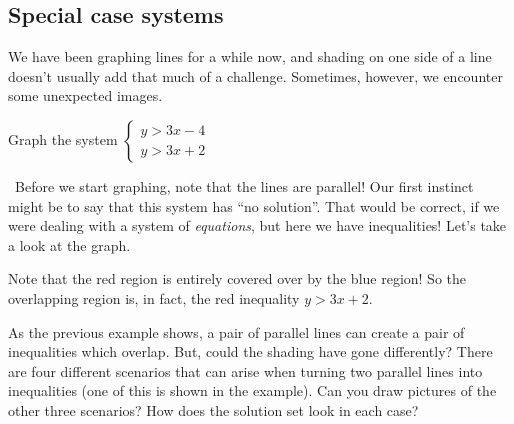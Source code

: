 \subsection{Special case systems}

We have been graphing lines for a while now, and shading on one side of a line doesn't usually add that much of a challenge. Sometimes, however, we encounter some unexpected images.

\begin{boxedex}

 Graph the system $\left\{\begin{aligned} y>3x-4 \\ y>3x+2 \end{aligned}\right.$

\exsoln\ Before we start graphing, note that the lines are parallel! Our first instinct might be to say that this system has ``no solution''. That would be correct, if we were dealing with a system of \textit{equations}, but here we have inequalities! Let's take a look at the graph.

\begin{center}
\end{center}

Note that the red region is entirely covered over by the blue region! So the overlapping region is, in fact, the red inequality $y> 3x+2$.
\end{boxedex}

As the previous example shows, a pair of parallel lines can create a pair of inequalities which overlap. But, could the shading have gone differently? There are four different scenarios that can arise when turning two parallel lines into inequalities (one of this is shown in the example). Can you draw pictures of the other three scenarios? How does the solution set look in each case?


